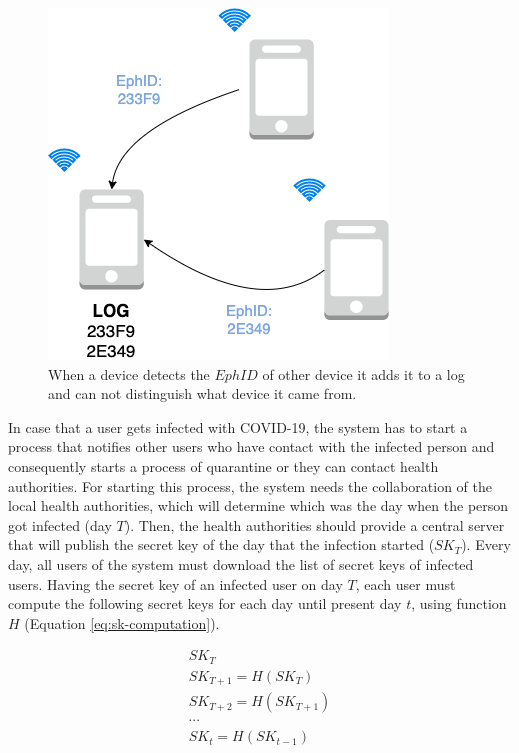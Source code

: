 \documentclass[a4paper, 12pt]{article}
\begin{document}
\begin{figure}[h]
    \centering
    \includegraphics[scale=0.4]{images/discussion/ephid-log.png}
    \caption{When a device detects the $EphID$ of other device it adds it to a log and can not distinguish what device it came from.}
    \label{fig:ephid-log}
\end{figure}

In case that a user gets infected with COVID-19, the system has to start a process that notifies other users who have contact with the infected person and consequently starts a process of quarantine or they can contact health authorities. For starting this process, the system needs the collaboration of the local health authorities, which will determine which was the day when the person got infected (day $T$). Then, the health authorities should provide a central server that will publish the secret key of the day that the infection started ($SK_T$). Every day, all users of the system must download the list of secret keys of infected users. Having the secret key of an infected user on day $T$, each user must compute the following secret keys for each day until present day $t$, using function $H$ (Equation \ref{eq:sk-computation}).

\begin{equation}
    \begin{split}
        SK_T \\
        SK_{T+1} = H(SK_T) \\
        SK_{T+2} = H(SK_{T+1}) \\
        \cdots \\
        SK_t = H(SK_{t-1})
    \end{split}
    \label{eq:sk-computation}
\end{equation}
\end{document}
